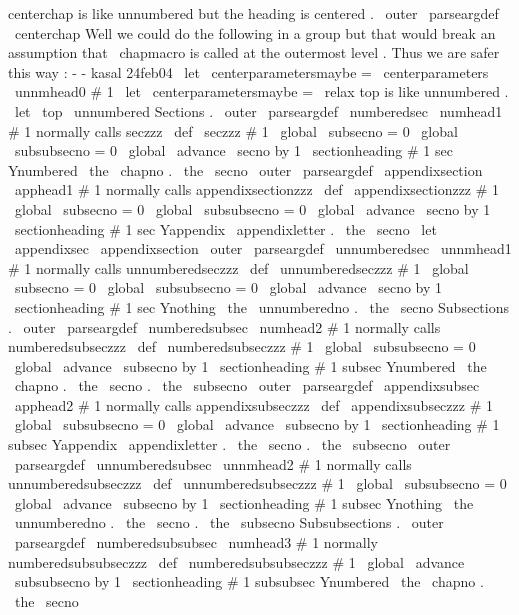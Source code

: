 {{{}
%
centerchap
is
like
unnumbered
but
the
heading
is
centered
.
\
outer
\
parseargdef
\
centerchap
{
%
%
Well
we
could
do
the
following
in
a
group
but
that
would
break
%
an
assumption
that
\
chapmacro
is
called
at
the
outermost
level
.
%
Thus
we
are
safer
this
way
:
-
-
kasal
24feb04
\
let
\
centerparametersmaybe
=
\
centerparameters
\
unnmhead0
{
#
1
}
%
\
let
\
centerparametersmaybe
=
\
relax
}
%
top
is
like
unnumbered
.
\
let
\
top
\
unnumbered
%
Sections
.
\
outer
\
parseargdef
\
numberedsec
{
\
numhead1
{
#
1
}
}
%
normally
calls
seczzz
\
def
\
seczzz
#
1
{
%
\
global
\
subsecno
=
0
\
global
\
subsubsecno
=
0
\
global
\
advance
\
secno
by
1
\
sectionheading
{
#
1
}
{
sec
}
{
Ynumbered
}
{
\
the
\
chapno
.
\
the
\
secno
}
%
}
\
outer
\
parseargdef
\
appendixsection
{
\
apphead1
{
#
1
}
}
%
normally
calls
appendixsectionzzz
\
def
\
appendixsectionzzz
#
1
{
%
\
global
\
subsecno
=
0
\
global
\
subsubsecno
=
0
\
global
\
advance
\
secno
by
1
\
sectionheading
{
#
1
}
{
sec
}
{
Yappendix
}
{
\
appendixletter
.
\
the
\
secno
}
%
}
\
let
\
appendixsec
\
appendixsection
\
outer
\
parseargdef
\
unnumberedsec
{
\
unnmhead1
{
#
1
}
}
%
normally
calls
unnumberedseczzz
\
def
\
unnumberedseczzz
#
1
{
%
\
global
\
subsecno
=
0
\
global
\
subsubsecno
=
0
\
global
\
advance
\
secno
by
1
\
sectionheading
{
#
1
}
{
sec
}
{
Ynothing
}
{
\
the
\
unnumberedno
.
\
the
\
secno
}
%
}
%
Subsections
.
\
outer
\
parseargdef
\
numberedsubsec
{
\
numhead2
{
#
1
}
}
%
normally
calls
numberedsubseczzz
\
def
\
numberedsubseczzz
#
1
{
%
\
global
\
subsubsecno
=
0
\
global
\
advance
\
subsecno
by
1
\
sectionheading
{
#
1
}
{
subsec
}
{
Ynumbered
}
{
\
the
\
chapno
.
\
the
\
secno
.
\
the
\
subsecno
}
%
}
\
outer
\
parseargdef
\
appendixsubsec
{
\
apphead2
{
#
1
}
}
%
normally
calls
appendixsubseczzz
\
def
\
appendixsubseczzz
#
1
{
%
\
global
\
subsubsecno
=
0
\
global
\
advance
\
subsecno
by
1
\
sectionheading
{
#
1
}
{
subsec
}
{
Yappendix
}
%
{
\
appendixletter
.
\
the
\
secno
.
\
the
\
subsecno
}
%
}
\
outer
\
parseargdef
\
unnumberedsubsec
{
\
unnmhead2
{
#
1
}
}
%
normally
calls
unnumberedsubseczzz
\
def
\
unnumberedsubseczzz
#
1
{
%
\
global
\
subsubsecno
=
0
\
global
\
advance
\
subsecno
by
1
\
sectionheading
{
#
1
}
{
subsec
}
{
Ynothing
}
%
{
\
the
\
unnumberedno
.
\
the
\
secno
.
\
the
\
subsecno
}
%
}
%
Subsubsections
.
\
outer
\
parseargdef
\
numberedsubsubsec
{
\
numhead3
{
#
1
}
}
%
normally
numberedsubsubseczzz
\
def
\
numberedsubsubseczzz
#
1
{
%
\
global
\
advance
\
subsubsecno
by
1
\
sectionheading
{
#
1
}
{
subsubsec
}
{
Ynumbered
}
%
{
\
the
\
chapno
.
\
the
\
secno
}}}}
